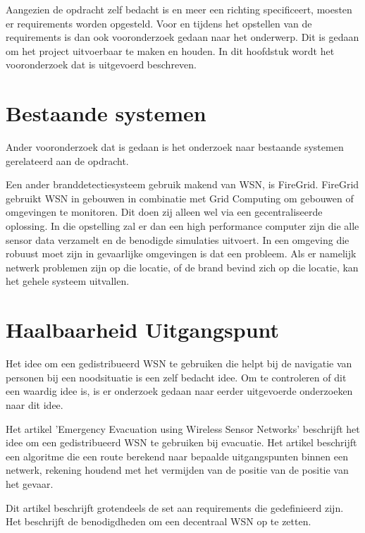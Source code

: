 
Aangezien de opdracht zelf bedacht is en meer een richting specificeert, moesten er requirements worden opgesteld. Voor en tijdens het opstellen van de requirements is dan ook vooronderzoek gedaan naar het onderwerp. Dit is gedaan om het project uitvoerbaar te maken en houden. In dit hoofdstuk wordt het vooronderzoek dat is uitgevoerd beschreven.

\section{Bestaande systemen}
Ander vooronderzoek dat is gedaan is het onderzoek naar bestaande systemen gerelateerd aan de opdracht. 

Een ander branddetectiesysteem gebruik makend van WSN, is FireGrid\cite{FireGrid}. FireGrid gebruikt WSN in gebouwen in combinatie met Grid Computing om gebouwen of omgevingen te monitoren. Dit doen zij alleen wel via een gecentraliseerde oplossing. In die opstelling zal er dan een high performance computer zijn die alle sensor data verzamelt en de benodigde simulaties uitvoert. In een omgeving die robuust moet zijn in gevaarlijke omgevingen is dat een probleem. Als er namelijk netwerk problemen zijn op die locatie, of de brand bevind zich op die locatie, kan het gehele systeem uitvallen. 


\section{Haalbaarheid Uitgangspunt}
Het idee om een gedistribueerd WSN te gebruiken die helpt bij de navigatie van personen bij een noodsituatie is een zelf bedacht idee. Om te controleren of dit een waardig idee is, is er onderzoek gedaan naar eerder uitgevoerde onderzoeken naar dit idee.

Het artikel 'Emergency Evacuation using Wireless Sensor Networks'\cite{BarnesEmEv} beschrijft het idee om een gedistribueerd WSN te gebruiken bij evacuatie. Het artikel beschrijft een algoritme die een route berekend naar bepaalde uitgangspunten binnen een netwerk, rekening houdend met het vermijden van de positie van de positie van het gevaar.

Dit artikel beschrijft grotendeels de set aan requirements die gedefinieerd zijn. Het beschrijft de benodigdheden om een decentraal WSN op te zetten. 

